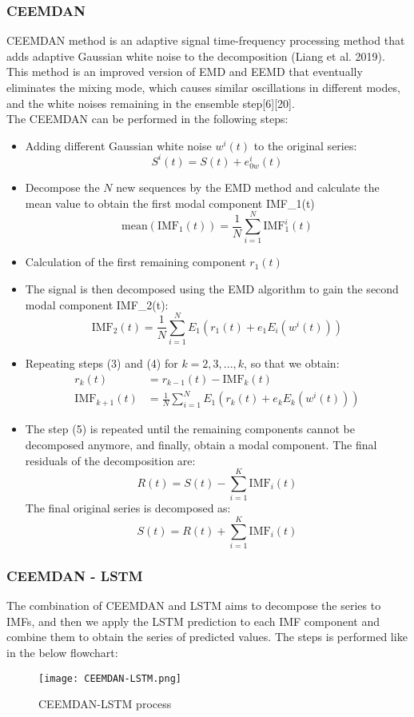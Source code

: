 \documentclass{ieeeojies}
\begin{document}
\subsubsection{CEEMDAN}
CEEMDAN method is an adaptive signal time-frequency processing method that adds adaptive Gaussian white noise to the decomposition (Liang et al. 2019). This method is an improved version of EMD and EEMD that eventually eliminates the mixing mode, which causes similar oscillations in different modes, and the white noises remaining in the ensemble step[6][20]. \\
The CEEMDAN can be performed in the following steps:
\begin{itemize} 
    \item Adding different Gaussian white noise \( w^i(t) \) to the original series:
    \[ S^i(t) = S(t) + e_{0w}^i(t) \]
    
    \item Decompose the \( N \) new sequences by the EMD method and calculate the mean value to obtain the first modal component IMF\_1(t)
    \[ \text{mean}(\text{IMF}_1(t)) = \frac{1}{N} \sum_{i=1}^{N} \text{IMF}_1^i(t) \]
    
    \item Calculation of the first remaining component \( r_1(t) \)
    
    \item The signal is then decomposed using the EMD algorithm to gain the second modal component IMF\_2(t):
    \[ \text{IMF}_2(t) = \frac{1}{N} \sum_{i=1}^{N} E_1(r_1(t) + e_1 E_i(w^i(t))) \]
    
    \item Repeating steps (3) and (4) for \( k = 2,3,...,k \), so that we obtain:
    \begin{align*}
    r_k(t) &= r_{k-1}(t) - \text{IMF}_k(t) \\
    \text{IMF}_{k+1}(t) &= \frac{1}{N} \sum_{i=1}^{N} E_1(r_k(t) + e_k E_k(w^i(t)))
    \end{align*}
    
    \item The step (5) is repeated until the remaining components cannot be decomposed anymore, and finally, obtain a modal component. The final residuals of the decomposition are:
    \[ R(t) = S(t) - \sum_{i=1}^{K} \text{IMF}_i(t) \]
    The final original series is decomposed as:
    \[ S(t) = R(t) + \sum_{i=1}^{K} \text{IMF}_i(t) \]
\end{itemize}

\subsubsection{CEEMDAN - LSTM}
The combination of CEEMDAN and LSTM aims to decompose the series to IMFs, and then we apply the LSTM prediction to each IMF component and combine them to obtain the series of predicted values. The steps is performed like in the below flowchart:
\begin{figure}[H]
	\centering
	\texttt{[image: CEEMDAN-LSTM.png]}
	\caption{CEEMDAN-LSTM process\centering}
	\label{fig1}
\end{figure}
\end{document}
